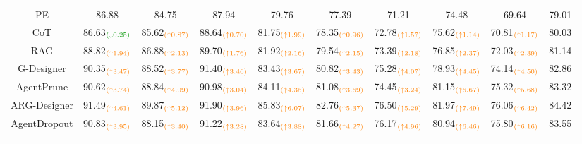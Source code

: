 \documentclass[lettersize,journal]{IEEEtran}
\theoremstyle{plain}
\begin{document}
\begin{table}[!t]
\begin{tabular}{cccccccccc}
PE & 86.88 & 84.75 & 87.94 & 79.76 & 77.39 & 71.21 & 74.48 & 69.64 & 79.01 \\
CoT & 86.63$_{\textcolor{mygreen}{(\downarrow 0.25)}}$ & 85.62$_{\textcolor{orange}{(\uparrow 0.87)}}$ & 88.64$_{\textcolor{orange}{(\uparrow 0.70)}}$ & 81.75$_{\textcolor{orange}{(\uparrow 1.99)}}$ & 78.35$_{\textcolor{orange}{(\uparrow 0.96)}}$ & 72.78$_{\textcolor{orange}{(\uparrow 1.57)}}$ & 75.62$_{\textcolor{orange}{(\uparrow 1.14)}}$ & 70.81$_{\textcolor{orange}{(\uparrow 1.17)}}$ & 80.03 \\
RAG & 88.82$_{\textcolor{orange}{(\uparrow 1.94)}}$ & 86.88$_{\textcolor{orange}{(\uparrow 2.13)}}$ & 89.70$_{\textcolor{orange}{(\uparrow 1.76)}}$ & 81.92$_{\textcolor{orange}{(\uparrow 2.16)}}$ & 79.54$_{\textcolor{orange}{(\uparrow 2.15)}}$ & 73.39$_{\textcolor{orange}{(\uparrow 2.18)}}$ & 76.85$_{\textcolor{orange}{(\uparrow 2.37)}}$ & 72.03$_{\textcolor{orange}{(\uparrow 2.39)}}$ & 81.14 \\ \hdashline
G-Designer & 90.35$_{\textcolor{orange}{(\uparrow 3.47)}}$ & 88.52$_{\textcolor{orange}{(\uparrow 3.77)}}$ & 91.40$_{\textcolor{orange}{(\uparrow 3.46)}}$ & 83.43$_{\textcolor{orange}{(\uparrow 3.67)}}$ & 80.82$_{\textcolor{orange}{(\uparrow 3.43)}}$ & 75.28$_{\textcolor{orange}{(\uparrow 4.07)}}$ & 78.93$_{\textcolor{orange}{(\uparrow 4.45)}}$ & 74.14$_{\textcolor{orange}{(\uparrow 4.50)}}$ & 82.86 \\
AgentPrune & 90.62$_{\textcolor{orange}{(\uparrow 3.74)}}$ & 88.84$_{\textcolor{orange}{(\uparrow 4.09)}}$ & 90.98$_{\textcolor{orange}{(\uparrow 3.04)}}$ & 84.11$_{\textcolor{orange}{(\uparrow 4.35)}}$ & 81.08$_{\textcolor{orange}{(\uparrow 3.69)}}$ & 74.45$_{\textcolor{orange}{(\uparrow 3.24)}}$ & 81.15$_{\textcolor{orange}{(\uparrow 6.67)}}$ & 75.32$_{\textcolor{orange}{(\uparrow 5.68)}}$ & 83.32 \\
ARG-Designer & 91.49$_{\textcolor{orange}{(\uparrow 4.61)}}$ & 89.87$_{\textcolor{orange}{(\uparrow 5.12)}}$ & 91.90$_{\textcolor{orange}{(\uparrow 3.96)}}$ & {85.83}$_{\textcolor{orange}{(\uparrow 6.07)}}$ & 82.76$_{\textcolor{orange}{(\uparrow 5.37)}}$ & 76.50$_{\textcolor{orange}{(\uparrow 5.29)}}$ & 81.97$_{\textcolor{orange}{(\uparrow 7.49)}}$ & 76.06$_{\textcolor{orange}{(\uparrow 6.42)}}$ & 84.42 \\
AgentDropout & 90.83$_{\textcolor{orange}{(\uparrow 3.95)}}$ & 88.15$_{\textcolor{orange}{(\uparrow 3.40)}}$ & 91.22$_{\textcolor{orange}{(\uparrow 3.28)}}$ & 83.64$_{\textcolor{orange}{(\uparrow 3.88)}}$ & 81.66$_{\textcolor{orange}{(\uparrow 4.27)}}$ & 76.17$_{\textcolor{orange}{(\uparrow 4.96)}}$ & 80.94$_{\textcolor{orange}{(\uparrow 6.46)}}$ & 75.80$_{\textcolor{orange}{(\uparrow 6.16)}}$ & 83.55 \\ \hdashline

\end{tabular}
\end{table}
\end{document}
